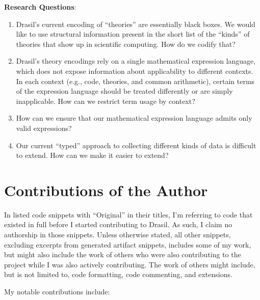 \noindent\textbf{Research Questions}:

\begin{enumerate}

      \item[\namedlabel{rq:modelkinds}{RQ1}] Drasil's current encoding of
            ``theories'' are essentially black boxes. We would like to use
            structural information present in the short list of the ``kinds'' of
            theories that show up in scientific computing. How do we codify
            that?

      \item[\namedlabel{rq:lang_division}{RQ2}] Drasil's theory encodings rely
            on a single mathematical expression language, which does not expose
            information about applicability to different contexts. In each
            context (e.g., code, theories, and common arithmetic), certain terms
            of the expression language should be treated differently or are
            simply inapplicable. How can we restrict term usage by context?

      \item[\namedlabel{rq:typing}{RQ3}] How can we ensure that our mathematical
            expression language admits only valid expressions?

      \item[\namedlabel{rq:chunkdb}{RQ4}] Our current ``typed'' approach to
            collecting different kinds of data is difficult to extend. How can
            we make it easier to extend?

\end{enumerate}

\section{Contributions of the Author}
\label{chap:intro:sec:contributions}

In listed code snippets with ``Original'' in their titles, I'm referring to code
that existed in full before I started contributing to Drasil. As such, I claim
no authorship in those snippets. Unless otherwise stated, all other snippets,
excluding excerpts from generated artifact snippets, includes some of my work,
but might also include the work of others who were also contributing to the
project while I was also actively contributing. The work of others might
include, but is not limited to, code formatting, code commenting, and
extensions.

My notable contributions include:

